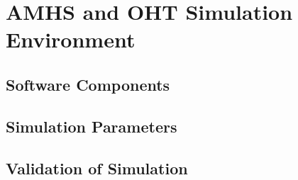 \chapter{AMHS and OHT Simulation Environment}
\label{cha:SimEnvironment}

\section{Software Components}
\label{sec:SWComponents}

\section{Simulation Parameters}
\label{sec:SimParameters}

\section{Validation of Simulation}
\label{sec:SimValidation}